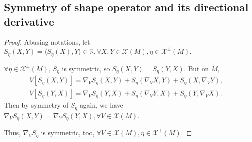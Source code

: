 
{

\subsection{Symmetry of shape operator and its directional derivative}

\newcommand*{\X}{\mathcal{X}} %

\begin{proof}
Abusing notations, let $S_\eta(X,Y)=\langle S_\eta(X), Y\rangle \in \mathbb{R}, \forall X,Y \in \X(M), \eta \in \X^\bot(M)$.
\par
$\forall \eta \in \X^\bot(M)$, $S_\eta$ is symmetric, so $S_\eta(X,Y)=S_\eta(Y,X)$. But on $M$,
\begin{align*}
V\left[S_\eta(X,Y)\right] = \nabla_V S_\eta(X,Y) + S_\eta(\nabla_V X, Y) + S_\eta(X, \nabla_V Y), \\
V\left[S_\eta(Y,X)\right] = \nabla_V S_\eta(Y,X) + S_\eta(\nabla_V Y, X) + S_\eta(Y, \nabla_V X). 
\end{align*}
Then by symmetry of $S_\eta$ again, we have $\nabla_V S_\eta(X,Y) = \nabla_V S_\eta(Y,X), \forall V \in \X(M)$.
\par
Thus, $\nabla_V S_\eta$ is symmetric, too, $\forall V\in \X(M), \eta \in \X^\bot(M)$.

\end{proof}

}
